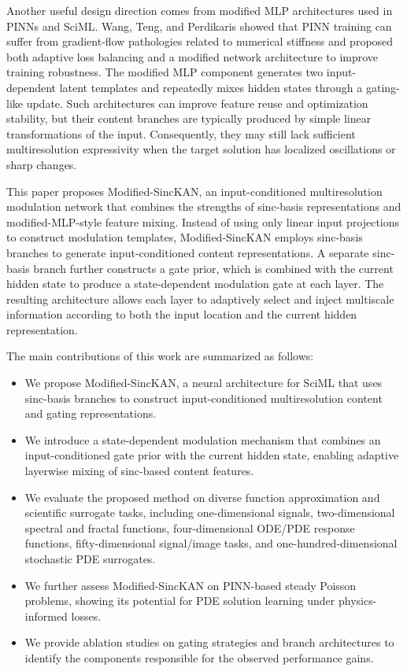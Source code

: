 \documentclass[preprint,12pt]{elsarticle}
\begin{document}
Another useful design direction comes from modified MLP architectures used in PINNs and SciML. Wang, Teng, and Perdikaris \cite{wang2021gradientpathologies} showed that PINN training can suffer from gradient-flow pathologies related to numerical stiffness and proposed both adaptive loss balancing and a modified network architecture to improve training robustness. The modified MLP component generates two input-dependent latent templates and repeatedly mixes hidden states through a gating-like update. Such architectures can improve feature reuse and optimization stability, but their content branches are typically produced by simple linear transformations of the input. Consequently, they may still lack sufficient multiresolution expressivity when the target solution has localized oscillations or sharp changes.

This paper proposes Modified-SincKAN, an input-conditioned multiresolution modulation network that combines the strengths of sinc-basis representations and modified-MLP-style feature mixing. Instead of using only linear input projections to construct modulation templates, Modified-SincKAN employs sinc-basis branches to generate input-conditioned content representations. A separate sinc-basis branch further constructs a gate prior, which is combined with the current hidden state to produce a state-dependent modulation gate at each layer. The resulting architecture allows each layer to adaptively select and inject multiscale information according to both the input location and the current hidden representation.

The main contributions of this work are summarized as follows:
\begin{itemize}
  \item We propose Modified-SincKAN, a neural architecture for SciML that uses sinc-basis branches to construct input-conditioned multiresolution content and gating representations.
  \item We introduce a state-dependent modulation mechanism that combines an input-conditioned gate prior with the current hidden state, enabling adaptive layerwise mixing of sinc-based content features.
  \item We evaluate the proposed method on diverse function approximation and scientific surrogate tasks, including one-dimensional signals, two-dimensional spectral and fractal functions, four-dimensional ODE/PDE response functions, fifty-dimensional signal/image tasks, and one-hundred-dimensional stochastic PDE surrogates.
  \item We further assess Modified-SincKAN on PINN-based steady Poisson problems, showing its potential for PDE solution learning under physics-informed losses.
  \item We provide ablation studies on gating strategies and branch architectures to identify the components responsible for the observed performance gains.
\end{itemize}
\end{document}
